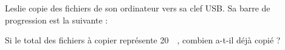 
\begin{exercice}\label{exosmath-0817}

    Leslie copie des fichiers de son ordinateur vers sa clef USB. Sa barre de progression est la suivante :
\begin{center}
   
\end{center}
Si le total des fichiers à copier représente \SI{20}{\gibi\byte}, combien a-t-il déjà copié ?

\end{exercice}
